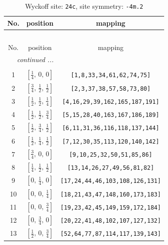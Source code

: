 \documentclass[fleqn,8pt]{jsarticle}
\begin{document}
\begin{longtable}{ccc}
\caption{Wyckoff site: {\tt 24c}, site symmetry: {\tt -4m.2}}
 \\
 \hline \hline
No. & position & mapping \\ \hline \endfirsthead

\multicolumn{2}{l}{\tablename\ \thetable{}} \\
 \hline \hline
No. & position & mapping \\ \hline \endhead

 \hline \hline
\multicolumn{2}{r}{\footnotesize\it continued ...} \\ \endfoot

 \hline \hline
\multicolumn{2}{r}{} \\ \endlastfoot

1 & $\left[ \frac{1}{4},\, 0,\, 0 \right]$ & {\tt [1,8,33,34,61,62,74,75]} \\ \hline
2 & $\left[ \frac{3}{4},\, \frac{1}{2},\, \frac{1}{2} \right]$ & {\tt [2,3,37,38,57,58,73,80]} \\ \hline
3 & $\left[ \frac{1}{2},\, \frac{1}{2},\, \frac{1}{4} \right]$ & {\tt [4,16,29,39,162,165,187,191]} \\ \hline
4 & $\left[ \frac{1}{2},\, \frac{1}{2},\, \frac{3}{4} \right]$ & {\tt [5,15,28,40,163,167,186,189]} \\ \hline
5 & $\left[ \frac{1}{2},\, \frac{3}{4},\, \frac{1}{2} \right]$ & {\tt [6,11,31,36,116,118,137,144]} \\ \hline
6 & $\left[ \frac{1}{2},\, \frac{1}{4},\, \frac{1}{2} \right]$ & {\tt [7,12,30,35,113,120,140,142]} \\ \hline
7 & $\left[ \frac{3}{4},\, 0,\, 0 \right]$ & {\tt [9,10,25,32,50,51,85,86]} \\ \hline
8 & $\left[ \frac{1}{4},\, \frac{1}{2},\, \frac{1}{2} \right]$ & {\tt [13,14,26,27,49,56,81,82]} \\ \hline
9 & $\left[ 0,\, \frac{1}{4},\, 0 \right]$ & {\tt [17,24,44,46,103,108,126,131]} \\ \hline
10 & $\left[ 0,\, 0,\, \frac{1}{4} \right]$ & {\tt [18,21,43,47,148,160,173,183]} \\ \hline
11 & $\left[ 0,\, 0,\, \frac{3}{4} \right]$ & {\tt [19,23,42,45,149,159,172,184]} \\ \hline
12 & $\left[ 0,\, \frac{3}{4},\, 0 \right]$ & {\tt [20,22,41,48,102,107,127,132]} \\ \hline
13 & $\left[ \frac{1}{2},\, 0,\, \frac{3}{4} \right]$ & {\tt [52,64,77,87,114,117,139,143]} \\ \hline

\end{longtable}
\end{document}
